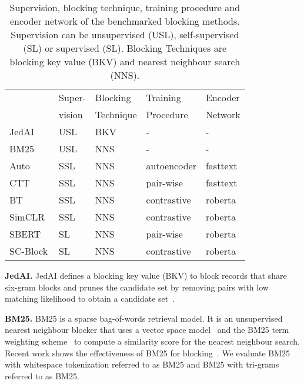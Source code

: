 \documentclass[sigconf,nonacm]{acmart}
\begin{document}
\begin{table}[]
\caption{Supervision, blocking technique, training procedure and encoder network of the benchmarked blocking methods. Supervision can be unsupervised (USL), self-supervised (SL) or supervised (SL). Blocking Techniques are blocking key value (BKV) and nearest neighbour search (NNS).}
\label{tab:blocking_methods}
\begin{tabular}{@{}lllll@{}}
\toprule
                      &  Super-      &  Blocking  &  Training      &  Encoder          \\ 
                      &  vision      &  Technique  &  Procedure      &  Network          \\ 
                      \midrule
JedAI~\cite{papadakis_three-dimensional_2020}                 &  USL     &  BKV        &   -             &  -                        \\
BM25~\cite{paulsen_sparkly_2023}                  &  USL     &  NNS        &  -             &  -                        \\
Auto~\cite{thirumuruganathan_deep_2021}          &  SSL  &  NNS        &  autoencoder  &  fasttext                 \\
CTT~\cite{thirumuruganathan_deep_2021}  &  SSL  &  NNS        &  pair-wise     &  fasttext                 \\
BT~\cite{wang_sudowoodo_2022}           &  SSL  &  NNS        &  contrastive   &  roberta \\
SimCLR~\cite{wang_sudowoodo_2022}                &  SSL  &  NNS        &  contrastive   &  roberta \\
SBERT~\cite{reimers_sentence-bert_2019}         &  SL       &  NNS        &  pair-wise     &  roberta \\
SC-Block              &  SL       &  NNS        &  contrastive   &  roberta \\ \bottomrule
\end{tabular}
\end{table}

\vspace{.1cm}\noindent\textbf{JedAI.}
JedAI defines a blocking key value (BKV) to block records that share six-gram blocks and prunes the candidate set by removing pairs with low matching likelihood to obtain a candidate set~\cite{efthymiou_parallel_2017}.


\vspace{.1cm}\noindent\textbf{BM25.} BM25 is a sparse bag-of-words retrieval model. 
It is an unsupervised nearest neighbour blocker that uses a vector space model~\cite{salton_vector_1975} and the BM25 term weighting scheme~\cite{robertson_probabilistic_2009} to compute a similarity score for the nearest neighbour search. Recent work shows the effectiveness of BM25 for blocking~\cite{paulsen_sparkly_2023}.
We evaluate BM25 with whitespace tokenization referred to as BM25 and BM25 with tri-grams referred to as BM25.
\end{document}
